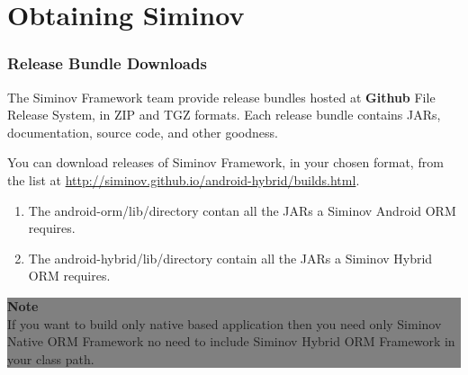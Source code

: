 \newpage
\chapter {\Large{Obtaining Siminov}}



\subsection{Release Bundle Downloads}
The Siminov Framework team provide release bundles hosted at \textbf{Github} File Release System, in ZIP and TGZ formats. Each release bundle contains JARs, documentation, source code, and other goodness.

\par
You can download releases of Siminov Framework, in your chosen format, from the list at \url{http://siminov.github.io/android-hybrid/builds.html}. 

	\begin{enumerate}

		\item \small The android-orm/lib/directory contan all the JARs a Siminov Android ORM requires.

		\item \small The android-hybrid/lib/directory contain all the JARs a Siminov Hybrid ORM requires. 

	\end{enumerate}




\begin{center}
	\colorbox{grey}{
		\parbox[t]{.8\linewidth}{
			\fontsize{11pt}{11pt}\selectfont %
			\vspace*{0.7cm} %
		
			\hfill \textbf{Note} \\
			\hfill If you want to build only native based application then you need only Siminov Native ORM Framework no need to include Siminov Hybrid ORM Framework in your class path.


			\vspace*{0.7cm} %
		}
}

\end{center}

